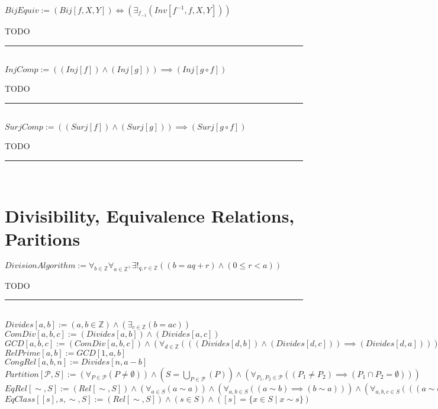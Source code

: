 \documentclass{book}
\newcommand{\abr}{:=}
\newcommand{\pr}[1]{\left(#1\right)}
\newcommand{\st}{\mathbin{|}}
\begin{document}
$BijEquiv \abr (Bij[f, X, Y]) \iff \pr{\exists_{f_{-1}}(Inv[f^{-1}, f, X, Y])}$ \\
\begin{enumerate}
  \lit TODO
\end{enumerate} \vspace{.75mm} \hrule \vspace{.75mm} \ \\

$InjComp \abr \pr{(Inj[f]) \land (Inj[g])} \implies (Inj[g \circ f])$
\begin{enumerate}
  \lit TODO
\end{enumerate} \vspace{.75mm} \hrule \vspace{.75mm} \ \\

$SurjComp \abr \pr{(Surj[f]) \land (Surj[g])} \implies (Surj[g \circ f])$
\begin{enumerate}
  \lit TODO
\end{enumerate} \vspace{.75mm} \hrule \vspace{.75mm} \ \\


\section{Divisibility, Equivalence Relations, Paritions}
$DivisionAlgorithm \abr \forall_{b \in \mathbb{Z}} \forall_{a \in \mathbb{Z}^+} \exists!_{q, r \in \mathbb{Z}}\pr{(b = a q + r) \land (0 \leq r < a)}$
\begin{enumerate}
  \lit TODO
\end{enumerate} \vspace{.75mm} \hrule \vspace{.75mm} \ \\

$Divides[a, b] \abr (a, b \in \mathbb{Z}) \land \pr{\exists_{c \in \mathbb{Z}}(b = a c)}$ \\
$ComDiv[a, b, c] \abr (Divides[a, b]) \land (Divides[a, c])$ \\
$GCD[a, b, c] \abr (ComDiv[a, b, c]) \land \pr{\forall_{d \in \mathbb{Z}}\pr{\pr{(Divides[d, b]) \land (Divides[d, c])} \implies (Divides[d, a])}}$ \\
$RelPrime[a, b] \abr GCD[1, a, b]$ \\
$CongRel[a, b, n] \abr Divides[n, a - b]$ \\

$Partition[\mathcal{P}, S] \abr \pr{\forall_{P \in \mathcal{P}}(P \neq \emptyset)} \land \pr{S = \bigcup\limits_{P \in \mathcal{P}}(P)} \land \pr{\forall_{P_1, P_2 \in \mathcal{P}}\pr{(P_1 \neq P_2) \implies (P_1 \cap P_2 = \emptyset)}}$ \\
$EqRel[\sim, S] \abr (Rel[\sim, S]) \land \pr{\forall_{a \in S}(a \sim a)} \land \pr{\forall_{a, b \in S}\pr{(a \sim b) \implies (b \sim a)}} \land \pr{\forall_{a, b, c \in S}\pr{\pr{(a \sim b) \land (b \sim c)} \implies (a \sim c)}}$ \\
$EqClass[[s], s, \sim, S] \abr (Rel[\sim, S]) \land (s \in S) \land ([s] = \{x \in S \st x \sim s\})$ \\
\end{document}
